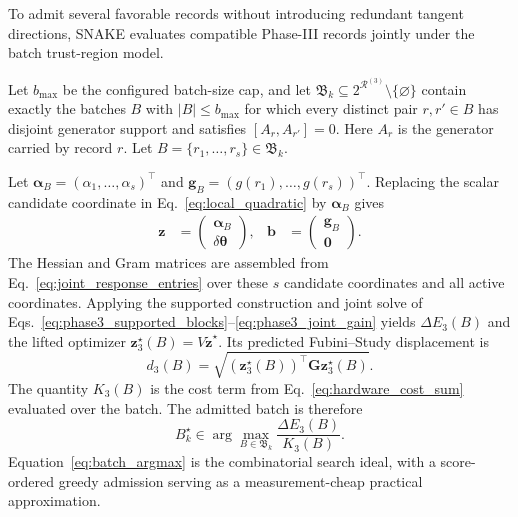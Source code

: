 \documentclass[
  reprint,
  amsmath,
  amssymb,
  aps,
  pra,
  nofootinbib,
  superscriptaddress,
  floatfix
]{revtex4-2}
\begin{document}
To admit several favorable records without introducing redundant tangent
directions, \textsc{SNAKE} evaluates compatible Phase-III records jointly under
the batch trust-region model.

Let \(b_{\max}\) be the configured batch-size cap, and let
\(\mathfrak B_k\subseteq
2^{\mathcal R^{(3)}}\setminus\{\varnothing\}\) contain exactly the
batches \(B\) with \(|B|\le b_{\max}\) for which every distinct pair
\(r,r'\in B\) has disjoint generator support and satisfies
\([A_r,A_{r'}]=0\). Here \(A_r\) is the generator carried by record \(r\).
Let
\(B=\{r_1,\ldots,r_s\}\in\mathfrak B_k\).

Let
\(\boldsymbol\alpha_B=(\alpha_1,\ldots,\alpha_s)^{\top}\) and
\(\mathbf g_B=(g(r_1),\ldots,g(r_s))^{\top}\). Replacing the scalar candidate
coordinate in Eq.~\eqref{eq:local_quadratic} by \(\boldsymbol\alpha_B\) gives
\begin{equation*}
\begin{aligned}
\mathbf z&=
\begin{pmatrix}
\boldsymbol\alpha_B\\
\delta\boldsymbol\theta
\end{pmatrix},
&
\mathbf b&=
\begin{pmatrix}
\mathbf g_B\\
\mathbf 0
\end{pmatrix}.
\end{aligned}
\end{equation*}
The Hessian and Gram matrices are assembled from
Eq.~\eqref{eq:joint_response_entries} over these \(s\) candidate coordinates
and all active coordinates. Applying the supported construction and joint
solve of Eqs.~\eqref{eq:phase3_supported_blocks}--\eqref{eq:phase3_joint_gain}
yields \(\Delta E_3(B)\) and the lifted optimizer
\(\mathbf z_3^\star(B)=V\widetilde{\mathbf z}^{\star}\). Its predicted
Fubini--Study displacement is
\begin{equation*}
d_3(B)
=\sqrt{(\mathbf z_3^\star(B))^{\top}
\mathbf G\mathbf z_3^\star(B)}.
\end{equation*}
The quantity \(K_3(B)\) is the cost term from
Eq.~\eqref{eq:hardware_cost_sum} evaluated over the batch. The admitted batch
is therefore
\begin{equation}
B_k^\star\in\arg\max_{B\in\mathfrak B_k}
\frac{\Delta E_3(B)}{K_3(B)}.
\label{eq:batch_argmax}
\end{equation}
Equation~\eqref{eq:batch_argmax} is the combinatorial search ideal, with a
score-ordered greedy admission serving as a measurement-cheap practical
approximation.
\end{document}
